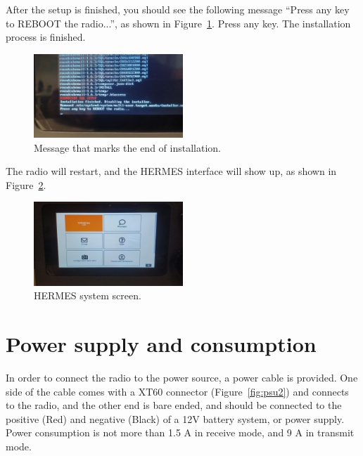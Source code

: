 \documentclass[11pt,a4paper]{article}
\begin{document}
After the setup is finished, you should see the following message ``Press any key to REBOOT the radio...'', as shown in Figure~\ref{fig:inst7}. Press any key. The installation process is finished.


\begin{figure}[H]
  \centering
  \includegraphics[width=0.5\textwidth]{pictures/inst-7.jpg}
  \caption{Message that marks the end of installation.}
  \label{fig:inst7}
\end{figure}

The radio will restart, and the HERMES interface will show up, as shown in Figure~\ref{fig:inst8}.

\begin{figure}[H]
  \centering
  \includegraphics[width=0.5\textwidth]{pictures/inst-8.jpg}
  \caption{HERMES system screen.}
  \label{fig:inst8}
\end{figure}







\section{Power supply and consumption}

In order to connect the radio to the power source, a power cable is provided. One side of the
cable comes with a XT60 connector (Figure~\ref{fig:psu2}) and connects to the radio, and the other end is bare ended,
and should be connected to the positive (Red) and negative (Black) of a 12V battery system, or power
supply. Power consumption is not more than 1.5 A in receive mode, and 9 A in transmit mode.
\end{document}
